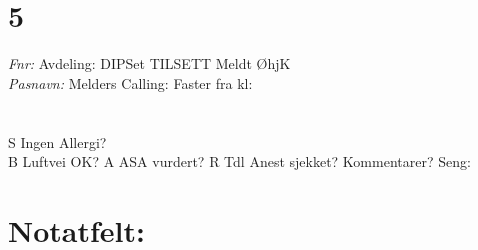 \documentclass[article]{res}
\begin{document}
\begin{resume}
\section{5 \hspace{2em} }\vspace{.8em}
  {\sl Fnr:}  \hspace{15em}Avdeling: \hfill DIPSet \makebox[0pt][l]{$\square$}\raisebox{.15ex}{\hspace{1em}}
   TILSETT \makebox[0pt][l]{$\square$}\raisebox{.15ex}{\hspace{0.7em}} Meldt ØhjK \makebox[0pt][l]{$\square$}\raisebox{.15ex}{\hspace{0.1em}}
   \\ \newline
  {\sl Pasnavn:}   \hfill Melders Calling: \hspace{2em} Faster fra kl:\hspace{2em} \\
  \\
  \\
  S \hfill Ingen Allergi? \makebox[0pt][l]{$\square$}\raisebox{.15ex}{\hspace{0.8em}} \\ \newline 
  B \hfill Luftvei OK? \makebox[0pt][l]{$\square$}\raisebox{.15ex}{\hspace{0.8em}} \newline \newline
  A \hfill ASA vurdert?\makebox[0pt][l]{$\square$}\raisebox{.15ex}{\hspace{0.8em}} \newline \newline
  R \hfill Tdl Anest sjekket? \makebox[0pt][l]{$\square$}\raisebox{.15ex}{\hspace{0.8em}} \newline \newline
  Kommentarer? \hfill Seng: \hspace{.8em}
\noindent\makebox[\linewidth]{\rule{\paperwidth}{0.4pt}}
\section{Notatfelt:}

\newpage


\end{resume}
\end{document}
